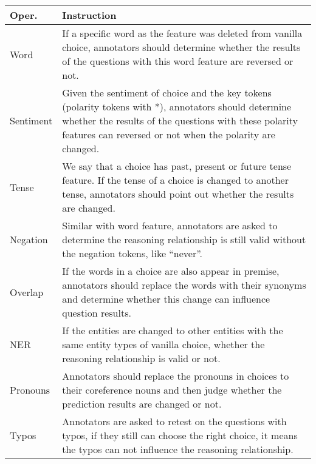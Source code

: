 \begin{table}[th]
        \centering
        \scriptsize
        \begin{tabularx}{\columnwidth}{l|X}
                \toprule
                \textbf{Oper.} &\textbf{Instruction}\\
                \hline
                Word&If a specific word as the feature was deleted from 
                vanilla choice, annotators should determine whether 
                the results of the questions with this word feature are reversed or not. \\
                \hline
                Sentiment
                &Given the sentiment of choice and the key tokens (polarity tokens with *), 
                annotators should determine whether the results of the questions 
                with these polarity features can reversed or not when the polarity are changed.\\
                \hline

                Tense
                & We say that a choice has past, present or future tense feature.
                If the tense of a choice is changed to another tense, annotators should
                point out whether the results are changed. \\
                \hline
                Negation
                & Similar with word feature, annotators are asked to determine the reasoning
                relationship is still valid without the negation tokens, like ``never''. 
                \\
                \hline
                Overlap
                & If the words in a choice are also appear in premise, annotators should 
                replace the words with their synonyms and determine whether this change 
                can influence question results. 
                \\
                \hline
                NER
                & If the entities are changed to other entities with the same entity types of
                vanilla choice, whether the reasoning relationship is valid or not. 
                \\
                \hline
                Pronouns
                & Annotators should replace the pronouns in choices to their coreference nouns 
                and then judge whether the prediction results are changed or not. 
                \\
                \hline
                Typos
                & Annotators are asked to retest on the questions with typos, if they still can
                choose the right choice, it means the typos can not influence the
                reasoning relationship. 
                \\ 


\end{tabularx}
\end{table}
